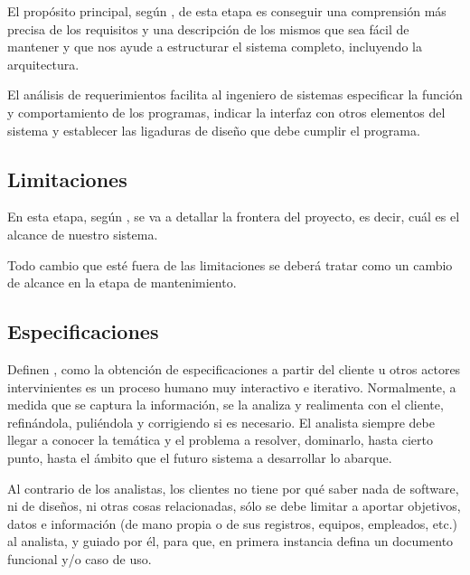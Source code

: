 \documentclass[12pt]{article}
\begin{document}
	\hspace{1.27cm}El propósito principal, según \textcite{maida_metodologias_2015}, de esta etapa es conseguir una comprensión más precisa de los requisitos y una descripción de los mismos que sea fácil de mantener y que nos ayude a estructurar el sistema completo, incluyendo la arquitectura.

	\hspace{1.27cm}El análisis de requerimientos facilita al ingeniero de sistemas especificar la función y comportamiento de los programas, indicar la interfaz con otros elementos del sistema y establecer las ligaduras de diseño que debe cumplir el programa.

	\subsection{Limitaciones}

	\hspace{1.27cm}En esta etapa, según \textcite{maida_metodologias_2015}, se va a detallar la frontera del proyecto, es decir, cuál es el alcance de nuestro
	sistema.

	\hspace{1.27cm}Todo cambio que esté fuera de las limitaciones se deberá tratar como un cambio de alcance en la
	etapa de mantenimiento.

	\subsection{Especificaciones}

	\hspace{1.27cm}Definen \textcite{maida_metodologias_2015}, como la obtención de especificaciones a partir del cliente u otros actores intervinientes es un proceso humano muy interactivo e iterativo. Normalmente, a medida que se captura la información, se la analiza y realimenta con el cliente, refinándola, puliéndola y corrigiendo si es necesario. El analista siempre debe llegar a conocer la temática y el problema a resolver, dominarlo, hasta cierto punto, hasta el ámbito que el futuro sistema a desarrollar lo abarque.

	\hspace{1.27cm}Al contrario de los analistas, los clientes no tiene por qué saber nada de software, ni de diseños, ni otras cosas relacionadas, sólo se debe limitar a aportar objetivos, datos e información (de mano propia	o de sus registros, equipos, empleados, etc.) al analista, y guiado por él, para que, en primera instancia defina un documento funcional y/o caso de uso.
\end{document}
